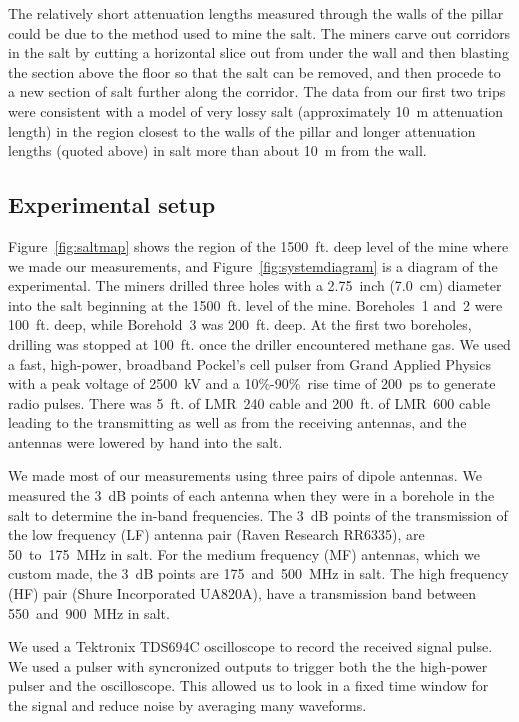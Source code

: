 \documentclass{elsart}
\begin{document}
  The relatively short attenuation lengths measured through the walls of the 
  pillar could be due to the method used to mine the salt. 
  The miners carve out corridors in the salt by cutting a 
  horizontal slice out from under the wall and then blasting the 
  section above the floor so that the salt can be removed, and
  then procede to a new section of salt further along the corridor.
  The data from our first two trips were consistent with a model of
  very lossy salt (approximately 10~m attenuation length) 
  in the region closest
  to the walls of the pillar  
  and longer attenuation lengths (quoted above) 
  in salt more than about 10~m from the wall.  
  
  \subsection{Experimental setup}
  
  Figure~\ref{fig:saltmap} shows the region of the 1500~ft. deep level of the mine 
  where we made our measurements, and Figure~\ref{fig:systemdiagram} is 
  a diagram of the experimental.  
  The miners drilled three holes with a 2.75~inch (7.0~cm) diameter into the salt 
  beginning at the 1500~ft. level of the mine.
  Boreholes~1 and~2 were 100~ft. deep, while Borehold~3 was 200~ft. deep.
  At the first two boreholes, drilling was stopped at 100~ft. once the
  driller encountered methane gas.
  We used a fast, high-power, broadband Pockel's cell 
  pulser from Grand Applied Physics with a peak voltage of 2500~kV and a 
  10\%-90\%~rise time of 200~ps to generate radio pulses.  
  There was 5~ft. of LMR~240 cable and
  200~ft. of LMR~600 cable leading to the transmitting as well as from the 
  receiving antennas, and the antennas were lowered by hand into the salt.
  
  We made most of our measurements using three pairs 
  of dipole antennas.  We measured the 3~dB points of each antenna when they were  
  in a borehole in the salt to determine the in-band 
  frequencies.  The 3~dB points of the transmission
  of the low frequency (LF) antenna pair (Raven Research RR6335), 
  are 50~to~175~MHz in salt.  For the medium frequency (MF) antennas, which we custom made, 
  the 3~dB points are
  175~and~500~MHz in salt.  The high frequency (HF) pair 
  (Shure Incorporated UA820A), have a transmission 
  band between 550~and~900~MHz in salt.
  
  We used a Tektronix TDS694C oscilloscope to 
  record the received signal pulse.  We used a pulser with syncronized outputs
  to trigger both the the high-power pulser and the oscilloscope.  This allowed
  us to look in a fixed time window for the signal and reduce noise by averaging
  many waveforms.
  
\end{document}
